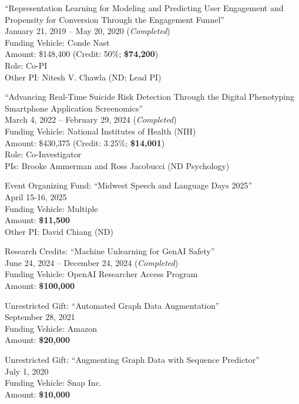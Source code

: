 \documentclass[10pt]{article}
\newenvironment{myindentpar}[1]%
{\begin{list}{}%
         {\setlength{\leftmargin}{#1}}%
         \item[]%
}
{\end{list}}
\newcounter{list}
\begin{document}
\begin{myindentpar}{0.75cm}
\hspace{-0.75cm}``Representation Learning for Modeling and Predicting User Engagement and Propensity for Conversion Through the Engagement Funnel'' \\
January 21, 2019 -- May 20, 2020 (\emph{Completed}) \\
Funding Vehicle: Conde Nast \\
Amount: \$148,400 (Credit: 50\%; \textbf{\$74,200}) \\
Role: {Co-PI} \\
Other PI: Nitesh V. Chawla (ND; Lead PI)

\hspace{-0.75cm}``Advancing Real-Time Suicide Risk Detection Through the Digital Phenotyping Smartphone Application Screenomics'' \\
March 4, 2022 -- February 29, 2024 (\emph{Completed}) \\
Funding Vehicle: National Institutes of Health  (NIH) \\
Amount: \$430,375 (Credit: 3.25\%; \textbf{\$14,001}) \\
Role: {Co-Investigator} \\
PIs: Brooke Ammerman and Ross Jacobucci (ND Psychology)

\hspace{-0.75cm}Event Organizing Fund: ``Midwest Speech and Language Days 2025''\\
April 15-16, 2025 \\
Funding Vehicle: Multiple \\
Amount: \textbf{\$11,500} \\
Other PI: David Chiang (ND)

\hspace{-0.75cm}Research Credits: ``Machine Unlearning for GenAI Safety''\\
June 24, 2024 -- December 24, 2024 (\emph{Completed}) \\
Funding Vehicle: OpenAI Researcher Access Program \\
Amount: \textbf{\$100,000}

\hspace{-0.75cm}Unrestricted Gift: ``Automated Graph Data Augmentation''\\
September 28, 2021 \\
Funding Vehicle: Amazon \\
Amount: \textbf{\$20,000}

\hspace{-0.75cm}Unrestricted Gift: ``Augmenting Graph Data with Sequence Predictor'' \\
July 1, 2020 \\
Funding Vehicle: Snap Inc. \\
Amount: \textbf{\$10,000}


\end{myindentpar}
\end{document}
